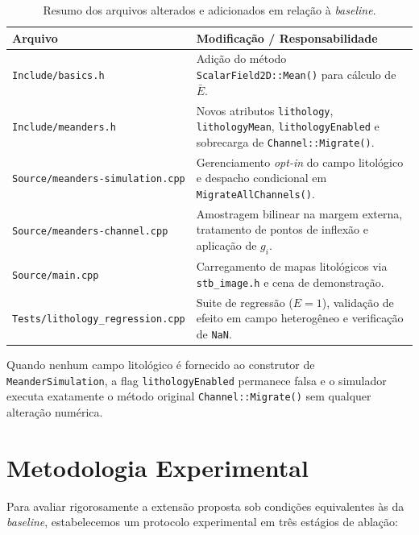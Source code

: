 \documentclass[10pt,twocolumn,a4paper]{article}
\begin{document}
\begin{table}[htbp]
    \centering
    \caption{Resumo dos arquivos alterados e adicionados em relação à \textit{baseline}.}
    \label{tab:arquivos_modificados}
    \footnotesize
    \begin{tabular}{p{} p{}}
        \toprule
        \textbf{Arquivo} & \textbf{Modificação / Responsabilidade} \\
        \midrule
        \texttt{Include/basics.h} & Adição do método \texttt{ScalarField2D::Mean()} para cálculo de $\bar{E}$. \\
        \texttt{Include/meanders.h} & Novos atributos \texttt{lithology}, \texttt{lithologyMean}, \texttt{lithologyEnabled} e sobrecarga de \texttt{Channel::Migrate()}. \\
        \texttt{Source/meanders-simulation.cpp} & Gerenciamento \textit{opt-in} do campo litológico e despacho condicional em \texttt{MigrateAllChannels()}. \\
        \texttt{Source/meanders-channel.cpp} & Amostragem bilinear na margem externa, tratamento de pontos de inflexão e aplicação de $g_i$. \\
        \texttt{Source/main.cpp} & Carregamento de mapas litológicos via \texttt{stb\_image.h} e cena de demonstração. \\
        \texttt{Tests/lithology\_regression.cpp} & Suite de regressão ($E=1$), validação de efeito em campo heterogêneo e verificação de \texttt{NaN}. \\
        \bottomrule
    \end{tabular}
\end{table}

Quando nenhum campo litológico é fornecido ao construtor de \texttt{MeanderSimulation}, a flag \texttt{lithologyEnabled} permanece falsa e o simulador executa exatamente o método original \texttt{Channel::Migrate()} sem qualquer alteração numérica.

\section{Metodologia Experimental}
\label{sec:metodologia}

Para avaliar rigorosamente a extensão proposta sob condições equivalentes às da \textit{baseline}, estabelecemos um protocolo experimental em três estágios de ablação:
\end{document}
